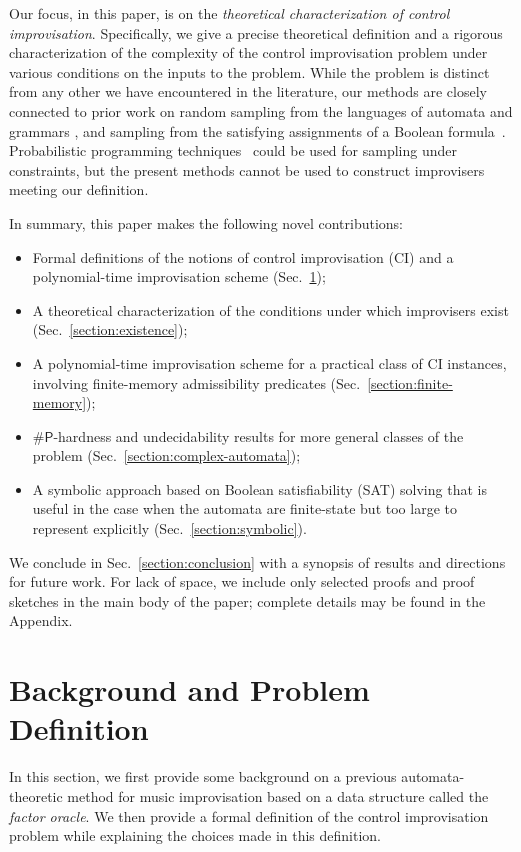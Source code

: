 \documentclass[a4paper,USenglish,numberwithinsect]{lipics}
\theoremstyle{plain}
\theoremstyle{definition}
\newcommand{\sharpP}{\ensuremath{\mathsf{\# P}}}
\begin{document}
Our focus, in this paper, is on the {\em theoretical characterization of
control improvisation}. Specifically, we give a precise theoretical
definition and a rigorous characterization of the complexity of the
control improvisation problem under various conditions on the inputs
to the problem. While the problem is distinct from any other we have
encountered in the literature, our methods are closely connected to
prior work on random sampling from the languages of automata and
grammars \cite{hickey-cohen,denise2006,sharpNFA}, and sampling from
the satisfying assignments of a Boolean formula~\cite{unigen}.
Probabilistic programming techniques~\cite{probprog} could be used
for sampling under constraints, but the present methods cannot be used
to construct improvisers meeting our definition.

In summary, this paper makes the following novel contributions:
\begin{itemize}
\item Formal definitions of the notions of control improvisation (CI) and a
polynomial-time improvisation scheme (Sec.~\ref{sec:prelim});
\item A theoretical characterization of the conditions under which
improvisers exist (Sec.~\ref{section:existence});
\item A polynomial-time improvisation scheme for a practical class of
CI instances, involving finite-memory admissibility predicates
(Sec.~\ref{section:finite-memory}); 
\item \sharpP-hardness and undecidability results for more general classes of
the problem (Sec.~\ref{section:complex-automata}); 
\item A symbolic approach based on Boolean satisfiability (SAT)
solving that is useful in the case when the automata
are finite-state but too large to represent explicitly (Sec.~\ref{section:symbolic}).
\end{itemize}
We conclude in Sec.~\ref{section:conclusion} with a
synopsis of results and directions for future work.
For lack of space, we include only selected proofs and proof sketches in the main body
of the paper; complete details may be found in the Appendix.

\section{Background and Problem Definition}
\label{sec:prelim}

In this section, we first provide some background on a previous
automata-theoretic method for music improvisation based on a data
structure called the {\em factor oracle}. We then provide a formal
definition of the control improvisation problem while explaining the
choices made in this definition.
\end{document}
